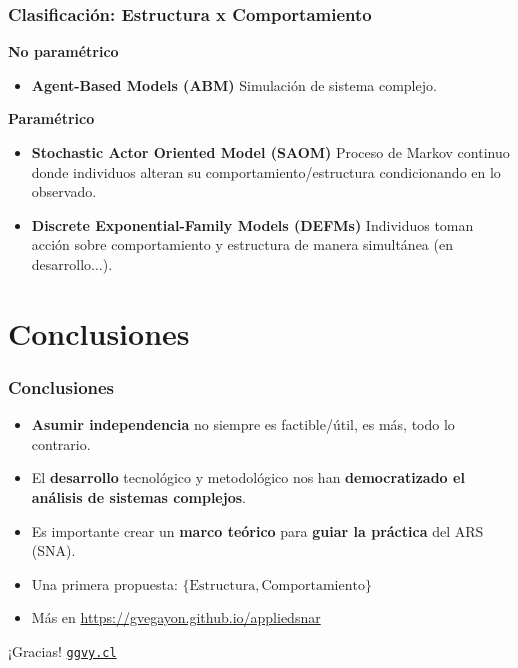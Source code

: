 \documentclass[aspectratio=169]{beamer}
\begin{document}
\begin{frame}
	\frametitle{Clasificación: Estructura x Comportamiento}
\pause
	\textbf{No paramétrico}
	\begin{itemize}
		\item \textbf{Agent-Based Models (ABM)} Simulación de sistema complejo.
	\end{itemize}
\pause
	\textbf{Paramétrico}
	\begin{itemize}
		\item \textbf{Stochastic Actor Oriented Model (SAOM)} Proceso de Markov continuo donde individuos alteran su comportamiento/estructura condicionando en lo observado.
		\item \textbf{Discrete Exponential-Family Models (DEFMs)} Individuos toman acción sobre comportamiento y estructura de manera simultánea (en desarrollo...).
	\end{itemize}


\end{frame}

\section{Conclusiones}

\begin{frame}
	\frametitle{Conclusiones}
	\pause
	\begin{itemize}
		\item \textbf{Asumir independencia} no siempre es factible/útil, es más, todo lo contrario.\pause
		\item El \textbf{desarrollo} tecnológico y metodológico nos han \textbf{democratizado el análisis de sistemas complejos}.\pause
		\item Es importante crear un \textbf{marco teórico} para \textbf{guiar la práctica} del ARS (SNA).\pause
		\item Una primera propuesta: $\{\mbox{Estructura},\mbox{Comportamiento}\}$\pause
		\item Más en \url{https://gvegayon.github.io/appliedsnar}
	\end{itemize}
\end{frame}

\begin{frame}
	\centering
	\Huge ¡Gracias! \normalsize 
\titlepage%
\vfill\hfill  \hyperlink{https://ggvy.cl}{\texttt{ggvy.cl}}
\end{frame}
\end{document}
